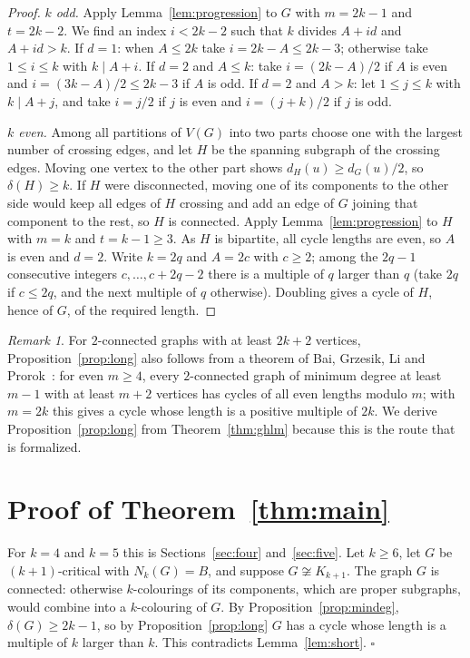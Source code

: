\documentclass[11pt]{article}
\theoremstyle{remark}
\newtheorem{remark}{Remark}
\begin{document}
\begin{proof}
\emph{$k$ odd.} Apply Lemma~\ref{lem:progression} to $G$ with $m=2k-1$ and
$t=2k-2$. We find an index $i<2k-2$ such that $k$ divides $A+id$ and
$A+id>k$. If $d=1$: when $A\le2k$ take $i=2k-A\le 2k-3$; otherwise take
$1\le i\le k$ with $k\mid A+i$. If $d=2$ and $A\le k$: take $i=(2k-A)/2$ if $A$
is even and $i=(3k-A)/2\le 2k-3$ if $A$ is odd. If $d=2$ and $A>k$: let
$1\le j\le k$ with $k\mid A+j$, and take $i=j/2$ if $j$ is even and $i=(j+k)/2$
if $j$ is odd.

\emph{$k$ even.} Among all partitions of $V(G)$ into two parts choose one with
the largest number of crossing edges, and let $H$ be the spanning subgraph of
the crossing edges. Moving one vertex to the other part shows
$d_H(u)\ge d_G(u)/2$, so $\delta(H)\ge k$. If $H$ were disconnected, moving one
of its components to the other side would keep all edges of $H$ crossing and
add an edge of $G$ joining that component to the rest, so $H$ is connected.
Apply Lemma~\ref{lem:progression} to $H$ with $m=k$ and $t=k-1\ge3$. As $H$ is
bipartite, all cycle lengths are even, so $A$ is even and $d=2$. Write $k=2q$
and $A=2c$ with $c\ge2$; among the $2q-1$ consecutive integers
$c,\dots,c+2q-2$ there is a multiple of $q$ larger than $q$ (take $2q$ if $c\le
2q$, and the next multiple of $q$ otherwise). Doubling gives a cycle of $H$,
hence of $G$, of the required length.
\end{proof}

\begin{remark}
For $2$-connected graphs with at least $2k+2$ vertices, Proposition~\ref{prop:long}
also follows from a theorem of Bai, Grzesik, Li and
Prorok~\cite[Theorem~1.6]{bglp}: for even $m\ge4$, every $2$-connected graph of
minimum degree at least $m-1$ with at least $m+2$ vertices has cycles of all
even lengths modulo $m$; with $m=2k$ this gives a cycle whose length is a
positive multiple of $2k$. We derive Proposition~\ref{prop:long} from
Theorem~\ref{thm:ghlm} because this is the route that is formalized.
\end{remark}

\section{Proof of Theorem~\ref{thm:main}}\label{sec:proof}

For $k=4$ and $k=5$ this is Sections~\ref{sec:four} and~\ref{sec:five}. Let
$k\ge6$, let $G$ be $(k+1)$-critical with $N_k(G)=B$, and suppose $G\not\cong
K_{k+1}$. The graph $G$ is connected: otherwise $k$-colourings of its
components, which are proper subgraphs, would combine into a $k$-colouring of
$G$. By Proposition~\ref{prop:mindeg}, $\delta(G)\ge2k-1$, so by
Proposition~\ref{prop:long} $G$ has a cycle whose length is a multiple of $k$
larger than $k$. This contradicts Lemma~\ref{lem:short}. \hfill$\square$
\end{document}
